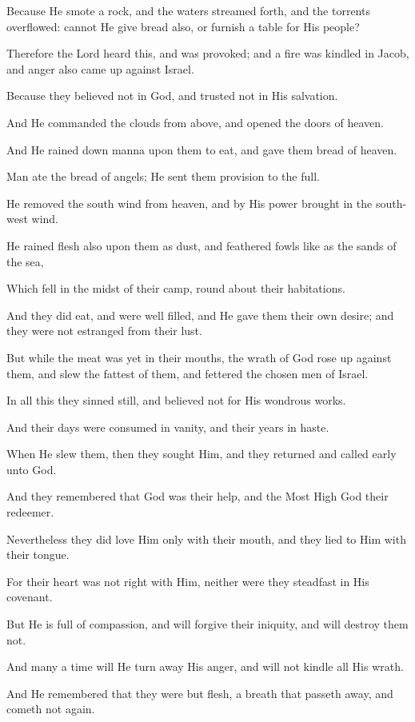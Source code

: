 Because He smote a rock, and the waters streamed forth, and the torrents overflowed: cannot He give bread also, or furnish a table for His people?

Therefore the Lord heard this, and was provoked; and a fire was kindled in Jacob, and anger also came up against Israel.

Because they believed not in God, and trusted not in His salvation.

And He commanded the clouds from above, and opened the doors of heaven.

And He rained down manna upon them to eat, and gave them bread of heaven.

Man ate the bread of angels; He sent them provision to the full.

He removed the south wind from heaven, and by His power brought in the south-west wind.

He rained flesh also upon them as dust, and feathered fowls like as the sands of the sea,

Which fell in the midst of their camp, round about their habitations.

And they did eat, and were well filled, and He gave them their own desire; and they were not estranged from their lust.

But while the meat was yet in their mouths, the wrath of God rose up against them, and slew the fattest of them, and fettered the chosen men of Israel.

In all this they sinned still, and believed not for His wondrous works.

And their days were consumed in vanity, and their years in haste.

When He slew them, then they sought Him, and they returned and called early unto God.

And they remembered that God was their help, and the Most High God their redeemer.

Nevertheless they did love Him only with their mouth, and they lied to Him with their tongue.

For their heart was not right with Him, neither were they steadfast in His covenant.

But He is full of compassion, and will forgive their iniquity, and will destroy them not.

And many a time will He turn away His anger, and will not kindle all His wrath.

And He remembered that they were but flesh, a breath that passeth away, and cometh not again.

